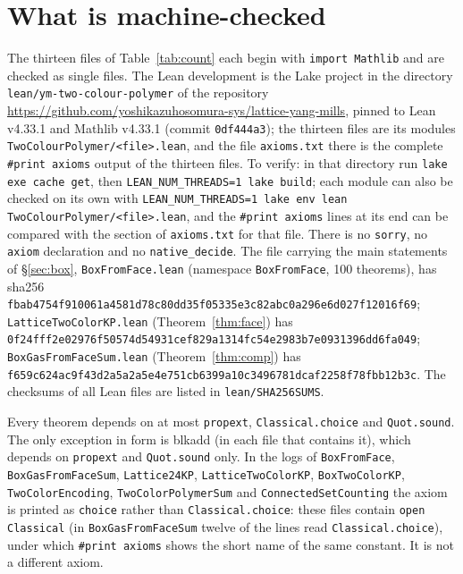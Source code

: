 \documentclass[11pt,a4paper]{article}
\theoremstyle{definition}
\theoremstyle{remark}
\DeclareRobustCommand{\lean}[1]{{\ttfamily\renewcommand{\_}{\textunderscore\allowbreak}#1}}
\begin{document}
\section{What is machine-checked}\label{sec:lean}

{\sloppy The thirteen files of Table~\ref{tab:count} each begin with \texttt{import Mathlib} and are checked as single files. The Lean development is the Lake project in the directory \texttt{lean/\allowbreak{}ym-two-colour-polymer} of the repository \url{https://github.com/yoshikazuhosomura-sys/lattice-yang-mills}, pinned to Lean v4.33.1 and Mathlib v4.33.1 (commit \texttt{0df444a3}); the thirteen files are its modules \texttt{TwoColourPolymer/\allowbreak{}<file>.lean}, and the file \texttt{axioms.txt} there is the complete \texttt{\#print axioms} output of the thirteen files. To verify: in that directory run \texttt{lake exe cache get}, then \texttt{LEAN\_NUM\_THREADS=1 lake build}; each module can also be checked on its own with \texttt{LEAN\_NUM\_THREADS=1 lake env lean TwoColourPolymer/\allowbreak{}<file>.lean}, and the \texttt{\#print axioms} lines at its end can be compared with the section of \texttt{axioms.txt} for that file. There is no \texttt{sorry}, no \texttt{axiom} declaration and no \texttt{native\_decide}. The file carrying the main statements of \S\ref{sec:box}, \texttt{BoxFromFace.lean} (namespace \texttt{BoxFromFace}, 100 theorems), has sha256 \texttt{fbab4754\allowbreak{}f910061a\allowbreak{}4581d78c\allowbreak{}80dd35f0\allowbreak{}5335e3c8\allowbreak{}2abc0a29\allowbreak{}6e6d027f\allowbreak{}12016f69}; \texttt{LatticeTwoColorKP.lean} (Theorem~\ref{thm:face}) has \texttt{0f24fff2\allowbreak{}e02976f5\allowbreak{}0574d549\allowbreak{}31cef829\allowbreak{}a1314fc5\allowbreak{}4e2983b7\allowbreak{}e0931396\allowbreak{}dd6fa049}; \texttt{BoxGasFromFaceSum.lean} (Theorem~\ref{thm:comp}) has \texttt{f659c624\allowbreak{}ac9f43d2\allowbreak{}a5a2a5e4\allowbreak{}e751cb63\allowbreak{}99a10c34\allowbreak{}96781dca\allowbreak{}f2258f78\allowbreak{}fbb12b3c}. The checksums of all Lean files are listed in \texttt{lean/\allowbreak{}SHA256SUMS}.\par}

Every theorem depends on at most \texttt{propext}, \texttt{Classical.choice} and \texttt{Quot.sound}. The only exception in form is \lean{blk\_add} (in each file that contains it), which depends on \texttt{propext} and \texttt{Quot.sound} only. In the logs of \texttt{BoxFromFace}, \texttt{BoxGasFromFaceSum}, \texttt{Lattice24KP}, \texttt{LatticeTwoColorKP}, \texttt{BoxTwoColorKP}, \texttt{TwoColorEncoding}, \texttt{TwoColorPolymerSum} and \texttt{ConnectedSetCounting} the axiom is printed as \texttt{choice} rather than \texttt{Classical.choice}: these files contain \texttt{open Classical} (in \texttt{BoxGasFromFaceSum} twelve of the lines read \texttt{Classical.choice}), under which \texttt{\#print axioms} shows the short name of the same constant. It is not a different axiom.
\end{document}
